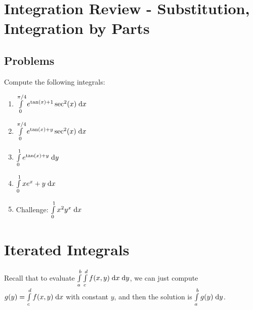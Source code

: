 \documentclass[letterpaper,11pt]{article}
\begin{document}
\section*{Integration Review - Substitution, Integration by Parts}
  \subsection*{Problems}
  Compute the following integrals:
  \begin{enumerate}
    \item $\int \limits_{0}^{\pi / 4} e^{\tan(x) + 1} \sec^2(x) \;\mathrm{d}x$\\
      \newline
      \newline

    \item $\int \limits_{0}^{\pi / 4} e^{\tan(x) + y} \sec^2(x) \;\mathrm{d}x$\\
      \newline
      \newline

    \item $\int \limits_{0}^{1} e^{\tan(x) + y} \;\mathrm{d}y$\\
      \newline
      \newline

    \item $\int \limits_{0}^{1} x e^{x} + y \;\mathrm{d}x$\\
      \newline
      \newline

    \item Challenge: $\int \limits_{0}^{1} x^2 y^{x} \;\mathrm{d}x$\\
      \newline
      \newline
  \end{enumerate}

\section*{Iterated Integrals}
  Recall that to evaluate $\int \limits_{a}^{b} \int \limits_{c}^{d} f(x, y) \;\mathrm{d}x \;\mathrm{d}y$,
  we can just compute $g(y) = \int \limits_{c}^{d} f(x, y) \;\mathrm{d}x$ with constant $y$,
  and then the solution is $\int \limits_{a}^{b} g(y) \;\mathrm{d}y$.
\end{document}
